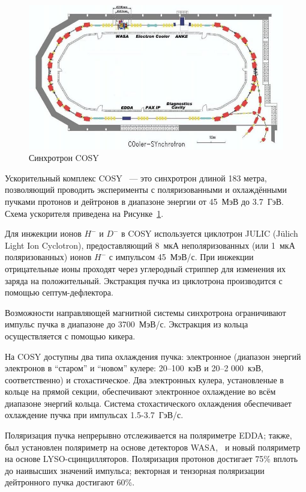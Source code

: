 
\begin{figure}[h]
	\centering
	\includegraphics[scale=.5]{images/chapter4/800px-COSY_Ring}
	\caption{Синхротрон COSY\label{fig:COSY_Ring}}
\end{figure}

Ускорительный комплекс COSY~\cite{COSY-Ring} --- это синхротрон длиной 183 метра, 
позволяющий проводить эксперименты с поляризованными и охлаждёнными пучками протонов и дейтронов 
в диапазоне энергии от 45~МэВ до 3.7~ГэВ. Схема ускорителя приведена на Рисунке~\ref{fig:COSY_Ring}.

Для инжекции ионов $H^-$ и $D^-$ в COSY  используется циклотрон JULIC (J\"ulich Light Ion Cyclotron),
предоставляющий 8~мкА неполяризованных (или 1~мкА поляризованных) ионов $H^-$ с импульсом 45~МэВ/с. 
При инжекции отрицательные ионы проходят через углеродный стриппер 
для изменения их заряда на положительный. Экстракция пучка из циклотрона 
производится с помощью септум-дефлектора.~\cite{JULIC-Injector}

Возможности направляющей магнитной системы синхротрона ограничивают импульс пучка в диапазоне 
до 3700~МэВ/с. Экстракция из кольца осуществляется с помощью кикера.

На COSY доступны два типа охлаждения пучка: электронное (диапазон энергий электронов в ``старом'' 
и ``новом'' кулере: 20--100~кэВ и 20--2 000~кэВ, соответственно) и стохастическое. 
%
Два электронных кулера, установленые в кольце на прямой секции, обеспечивают 
электронное охлаждение во всём диапазоне энергий кольца. Система стохастического охлаждения 
обеспечивает охлаждение пучка при импульсах 1.5-3.7~ГэВ/с.

Поляризация пучка непрерывно отслеживается на поляриметре  EDDA; 
также, был установлен поляриметр на основе детекторов WASA,~\cite{COSY:WASA} и новый поляриметр 
на основе LYSO-сцинцилляторов.
Поляризация протонов достигает 75\% вплоть до наивысших значений импульса; 
векторная и тензорная поляризации дейтронного пучка достигают 60\%.~\cite[стр.~32]{YellowReport}